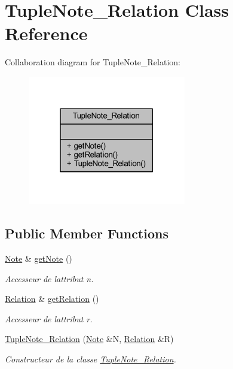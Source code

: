 \hypertarget{class_tuple_note___relation}{}\section{Tuple\+Note\+\_\+\+Relation Class Reference}
\label{class_tuple_note___relation}


Collaboration diagram for Tuple\+Note\+\_\+\+Relation\+:\nopagebreak
\begin{figure}[H]
\begin{center}
\leavevmode
\includegraphics[width=196pt]{class_tuple_note___relation__coll__graph}
\end{center}
\end{figure}
\subsection*{Public Member Functions}
\begin{DoxyCompactItemize}
\item 
\hyperlink{class_note}{Note} \& \hyperlink{class_tuple_note___relation_a8a3f889d3198a14629e1cabd74985c6d}{get\+Note} ()
\begin{DoxyCompactList}\small\item\em Accesseur de l\textquotesingle{}attribut n. \end{DoxyCompactList}\item 
\hyperlink{class_relation}{Relation} \& \hyperlink{class_tuple_note___relation_ad326a5fee3d7bec52bda9e0234377d8e}{get\+Relation} ()
\begin{DoxyCompactList}\small\item\em Accesseur de l\textquotesingle{}attribut r. \end{DoxyCompactList}\item 
\hyperlink{class_tuple_note___relation_adc3d9a6e637361eedd2e561ae957e1fb}{Tuple\+Note\+\_\+\+Relation} (\hyperlink{class_note}{Note} \&N, \hyperlink{class_relation}{Relation} \&R)
\begin{DoxyCompactList}\small\item\em Constructeur de la classe \hyperlink{class_tuple_note___relation}{Tuple\+Note\+\_\+\+Relation}. \end{DoxyCompactList}\end{DoxyCompactItemize}



